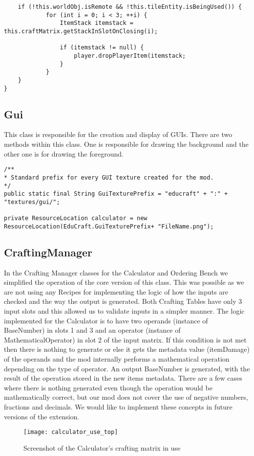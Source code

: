 \begin{itemize}
\begin{lstlisting}
	if (!this.worldObj.isRemote && !this.tileEntity.isBeingUsed()) {
			for (int i = 0; i < 3; ++i) {
				ItemStack itemstack = this.craftMatrix.getStackInSlotOnClosing(i);
            
				if (itemstack != null) {
					player.dropPlayerItem(itemstack;
				}
			}
	}
}
\end{lstlisting}
\end{itemize}

\subsection{Gui}
This class is responsible for the creation and display of GUIs.
There are two methods within this class. One is responsible for drawing the background and the other one is for drawing the foreground.\newline\newline
\begin{lstlisting}
/**
* Standard prefix for every GUI texture created for the mod.
*/
public static final String GuiTexturePrefix = "educraft" + ":" + "textures/gui/";

private ResourceLocation calculator = new ResourceLocation(EduCraft.GuiTexturePrefix+ "FileName.png");
\end{lstlisting}

\subsection{CraftingManager}
In the Crafting Manager classes for the Calculator and Ordering Bench we simplified the operation of the core version of this class. This was possible as we are not using any Recipes for implementing the logic of how the inputs are checked and the way the output is generated. Both Crafting Tables have only 3 input slots and this allowed us to validate inputs in a simpler manner.\newline\newline
The logic implemented for the Calculator is to have two operands (instance of BaseNumber) in slots 1 and 3 and an operator (instance of MathematicalOperator) in slot 2 of the input matrix. If this condition is not met then there is nothing to generate or else it gets the metadata value (itemDamage) of the operands and the mod internally performs a mathematical operation depending on the type of operator. An output BaseNumber is generated, with the result of the operation stored in the new items metadata. There are a few cases where there is nothing generated even though the operation would be mathematically correct, but our mod does not cover the use of negative numbers, fractions and decimals. We would like to implement these concepts in future versions of the extension.\newline\newline
\begin{figure}[H]
\centering
\texttt{[image: calculator\_use\_top]}
\caption{Screenshot of the Calculator's crafting matrix in use}
\end{figure}


